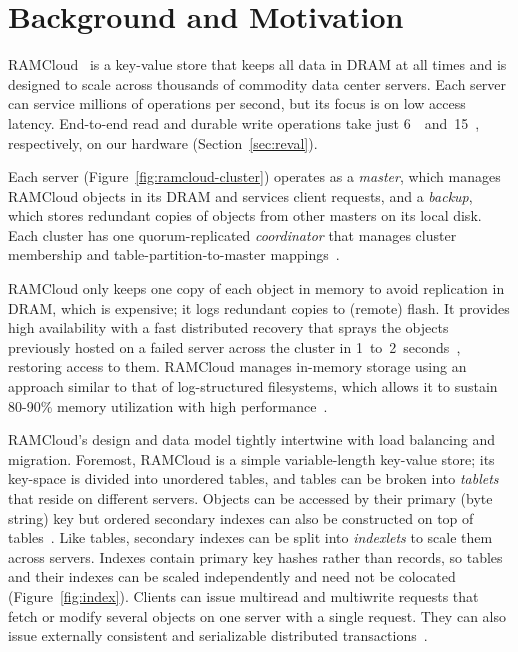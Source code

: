 \section{Background and Motivation}
\label{sec:rmotivation}

RAMCloud~\cite{ramcloud} is a key-value store that keeps all data in
DRAM at all times and is designed to scale across thousands of commodity data
center servers. Each server can service millions of operations per
second, but its focus is on low access latency.  End-to-end read and durable
write operations take just 6~\us~and~15~\us,
respectively, on our hardware (Section~\ref{sec:reval}).

Each server (Figure~\ref{fig:ramcloud-cluster}) operates as a \emph{master},
which manages RAMCloud objects in its DRAM and services client requests, and a
\emph{backup}, which stores redundant copies of objects from other masters on
its local disk.  Each cluster has one quorum-replicated \emph{coordinator} that
manages cluster membership and table-partition-to-master mappings~\cite{ongaro:raft}.

RAMCloud only keeps one copy of each object in memory to avoid replication in
DRAM, which is expensive; it logs redundant copies to (remote) flash.  It provides
high availability with a fast distributed recovery that sprays the objects 
previously hosted on
a failed server across the cluster in
1~to~2~seconds~\cite{ramcloud-recovery}, restoring access to them.
RAMCloud manages
in-memory storage using an approach similar to that of log-structured
filesystems, which allows it to sustain 80-90\% memory utilization
with high performance~\cite{ramcloud-lsm}.

RAMCloud's design and data model tightly intertwine with load balancing and migration.
Foremost, RAMCloud is a simple variable-length key-value store; its key-space
is divided into unordered tables, and tables can be broken into {\em tablets}
that reside on different servers.  Objects can be accessed by their primary (byte
string) key but ordered secondary indexes can also be constructed on top of
tables~\cite{ramcloud-slik}. Like tables, secondary indexes can be split into
{\em indexlets} to scale them across servers. Indexes contain primary key hashes
rather than records, so tables and their indexes can be scaled independently
and need not be colocated (Figure~\ref{fig:index}). Clients can issue multiread
and multiwrite requests that fetch or modify several objects on one server with
a single request. They can also issue externally consistent and serializable
distributed transactions~\cite{ramcloud-rifl}.


